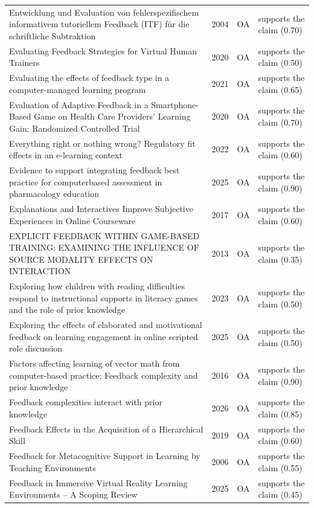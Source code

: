 \begin{longtable}{@{}%
  >{\raggedright\arraybackslash}p{}c%
  >{\raggedright\arraybackslash}p{}%
  >{\raggedright\arraybackslash}p{}@{}}
Entwicklung und Evaluation von fehlerspezifischem informativem tutoriellem Feedback (ITF) für die schriftliche Subtraktion & 2004 & OA & supports the claim (0.70) \\
Evaluating Feedback Strategies for Virtual Human Trainers & 2020 & OA & supports the claim (0.50) \\
Evaluating the effects of feedback type in a computer-managed learning program & 2021 & OA & supports the claim (0.65) \\
Evaluation of Adaptive Feedback in a Smartphone-Based Game on Health Care Providers' Learning Gain: Randomized Controlled Trial & 2020 & OA & supports the claim (0.70) \\
Everything right or nothing wrong? Regulatory fit effects in an e-learning context & 2022 & OA & supports the claim (0.60) \\
Evidence to support integrating feedback best practice for computerbased assessment in pharmacology education & 2025 & OA & supports the claim (0.90) \\
Explanations and Interactives Improve Subjective Experiences in Online Courseware & 2017 & OA & supports the claim (0.60) \\
EXPLICIT FEEDBACK WITHIN GAME-BASED TRAINING: EXAMINING THE INFLUENCE OF SOURCE MODALITY EFFECTS ON INTERACTION & 2013 & OA & supports the claim (0.35) \\
Exploring how children with reading difficulties respond to instructional supports in literacy games and the role of prior knowledge & 2023 & OA & supports the claim (0.50) \\
Exploring the effects of elaborated and motivational feedback on learning engagement in online scripted role discussion & 2025 & OA & supports the claim (0.50) \\
Factors affecting learning of vector math from computer-based practice: Feedback complexity and prior knowledge & 2016 & OA & supports the claim (0.90) \\
Feedback complexities interact with prior knowledge & 2026 & OA & supports the claim (0.85) \\
Feedback Effects in the Acquisition of a Hierarchical Skill & 2019 & OA & supports the claim (0.60) \\
Feedback for Metacognitive Support in Learning by Teaching Environments & 2006 & OA & supports the claim (0.55) \\
Feedback in Immersive Virtual Reality Learning Environments -- A Scoping Review & 2025 & OA & supports the claim (0.45) \\

\end{longtable}
